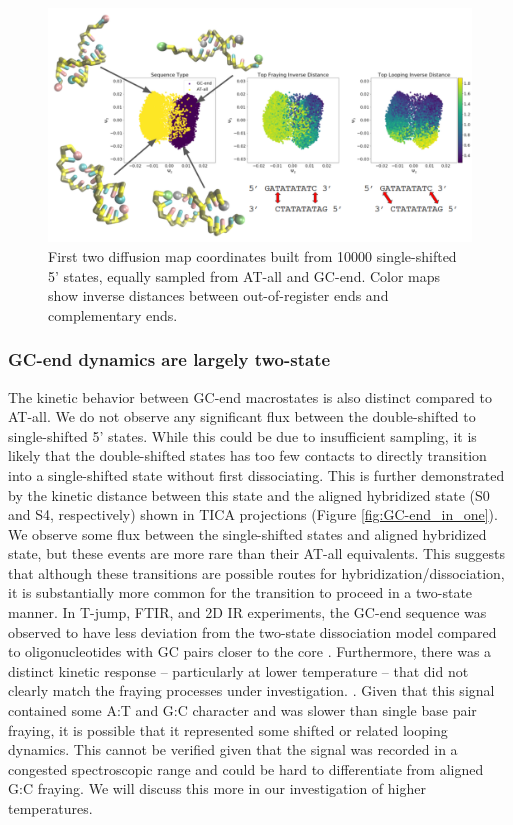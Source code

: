 \documentclass[journal=jpcbfk,manuscript=article]{achemso}
\begin{document}
\begin{figure}[ht!]
	\begin{center}
        \includegraphics[width=\textwidth]{Figs/figs_0804/GC-end_dmaps.png}
        \caption{First two diffusion map coordinates built from 10000 single-shifted 5' states, equally sampled from AT-all and GC-end. Color maps show inverse distances between out-of-register ends and complementary ends. }
        \label{fig:GC-end_dmaps}
	\end{center}
\end{figure}


\subsubsection{GC-end dynamics are largely two-state}

The kinetic behavior between GC-end macrostates is also distinct compared to AT-all. We do not observe any significant flux between the double-shifted to single-shifted 5' states. While this could be due to insufficient sampling, it is likely that the double-shifted states has too few contacts to directly transition into a single-shifted state without first dissociating. This is further demonstrated by the kinetic distance between this state and the aligned hybridized state (S0 and S4, respectively) shown in TICA projections (Figure \ref{fig:GC-end_in_one}). We observe some flux between the single-shifted states and aligned hybridized state, but these events are more rare than their AT-all equivalents. This suggests that although these transitions are possible routes for hybridization/dissociation, it is substantially more common for the transition to proceed in a two-state manner. In T-jump, FTIR, and 2D IR experiments, the GC-end sequence was observed to have less deviation from the two-state dissociation model compared to oligonucleotides with GC pairs closer to the core \citep{Sanstead2016}. Furthermore, there was a distinct kinetic response -- particularly at lower temperature -- that did not clearly match the fraying processes under investigation. \citep{Sanstead2018DirectDehybridization}. Given that this signal contained some A:T and G:C character and was slower than single base pair fraying, it is possible that it represented some shifted or related looping dynamics. This cannot be verified given that the signal was recorded in a congested spectroscopic range and could be hard to differentiate from aligned G:C fraying. We will discuss this more in our investigation of higher temperatures.
\end{document}
